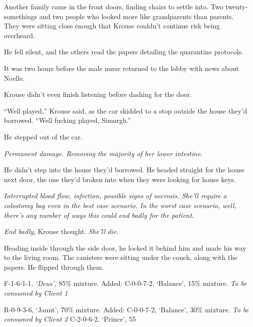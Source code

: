 Another family came in the front doors, finding chairs to settle into.  Two twenty-somethings and two people who looked more like grandparents than parents.  They were sitting close enough that Krouse couldn't continue risk being overheard.



He fell silent, and the others read the papers detailing the quarantine protocols.



It was two hours before the male nurse returned to the lobby with news about Noelle.



Krouse didn't even finish listening before dashing for the door.



\sectionbreak



``Well played,'' Krouse said, as the car skidded to a stop outside the house they'd borrowed.  ``Well fucking played, Simurgh.''



He stepped out of the car.



\emph{Permanent damage.  Removing the majority of her lower intestine.}



He didn't step into the house they'd borrowed.  He headed straight for the house next door, the one they'd broken into when they were looking for house keys.



\emph{Interrupted blood flow, infection, possible signs of necrosis.  She'll require a colostomy bag even in the best case scenario. In the worst case scenario, well, there's any number of ways this could end badly for the patient}.



\emph{End badly}, Krouse thought.  \emph{She'll die.}



Heading inside through the side door, he locked it behind him and made his way to the living room.  The canisters were sitting under the couch, along with the papers.  He flipped through them.



  F-1-6-1-1, \emph{`Deus', }85\% mixture.
Added: C-0-0-7-2, `Balance', 15\% mixture.\emph{           To be consumed by Client 1}



 R-0-9-3-6, `Jaunt', 70\% mixture.           Added: C-0-0-7-2, `Balance', 30\% mixture.\emph{           To be consumed by Client 2} C-2-0-6-2, `Prince', 55%



